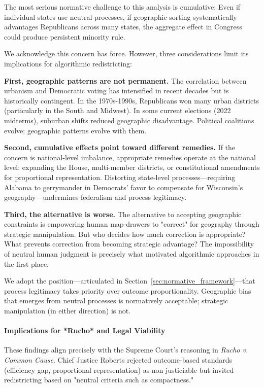 The most serious normative challenge to this analysis is cumulative: Even if individual states use neutral processes, if geographic sorting systematically advantages Republicans across many states, the aggregate effect in Congress could produce persistent minority rule.

We acknowledge this concern has force. However, three considerations limit its implications for algorithmic redistricting:

\textbf{First, geographic patterns are not permanent.} The correlation between urbanism and Democratic voting has intensified in recent decades but is historically contingent. In the 1970s-1990s, Republicans won many urban districts (particularly in the South and Midwest). In some current elections (2022 midterms), suburban shifts reduced geographic disadvantage. Political coalitions evolve; geographic patterns evolve with them.

\textbf{Second, cumulative effects point toward different remedies.} If the concern is national-level imbalance, appropriate remedies operate at the national level: expanding the House, multi-member districts, or constitutional amendments for proportional representation. Distorting state-level processes---requiring Alabama to gerrymander in Democrats' favor to compensate for Wisconsin's geography---undermines federalism and process legitimacy.

\textbf{Third, the alternative is worse.} The alternative to accepting geographic constraints is empowering human map-drawers to "correct" for geography through strategic manipulation. But who decides how much correction is appropriate? What prevents correction from becoming strategic advantage? The impossibility of neutral human judgment is precisely what motivated algorithmic approaches in the first place.

We adopt the position---articulated in Section~\ref{sec:normative_framework}---that process legitimacy takes priority over outcome proportionality. Geographic bias that emerges from neutral processes is normatively acceptable; strategic manipulation (in either direction) is not.

\paragraph{Implications for *Rucho* and Legal Viability}

These findings align precisely with the Supreme Court's reasoning in \textit{Rucho v. Common Cause}. Chief Justice Roberts rejected outcome-based standards (efficiency gap, proportional representation) as non-justiciable but invited redistricting based on "neutral criteria such as compactness."

